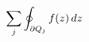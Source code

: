 \documentclass[preview]{standalone}
\begin{document}
\begin{align*}
\special{dvisvgm:raw <g id='unique000'>}\sum_{j} \oint_{\partial Q_j} f(z)\, dz\special{dvisvgm:raw </g>}
\end{align*}
\end{document}
